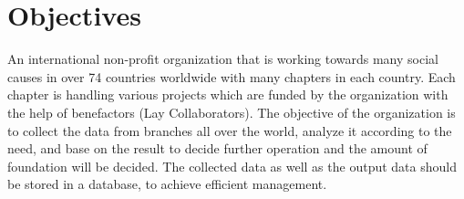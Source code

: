 
\color{red}
\section*{Objectives}

\color{black}
An international non-profit organization that is working towards many social causes in over 74 countries worldwide with many chapters in each country. Each chapter is handling various projects which are funded by the organization with the help of benefactors (Lay Collaborators). The objective of the organization is to collect the data from branches all over the world, analyze it according to the need, and base on the result to decide further operation and the amount of foundation will be decided. The collected data as well as the output data should be stored in a database, to achieve efficient management.
